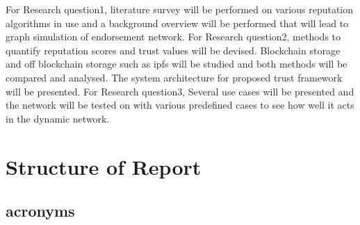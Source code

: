 For Research question1, literature survey will be performed on various 
reputation algorithms in use and a background overview will be 
performed that will lead to graph simulation of endorsement network.  
For Research question2, methods to quantify reputation scores and trust 
values will be devised. Blockchain storage and off blockchain storage 
such as ipfs will be studied and both methods will be compared and 
analysed. The system architecture for proposed trust framework will be 
presented. For Research question3, Several use cases will be presented 
and the network will be tested on with various predefined cases to see 
how well it acts in the dynamic network. 

\section{Structure of Report}
\subsection{acronyms}


